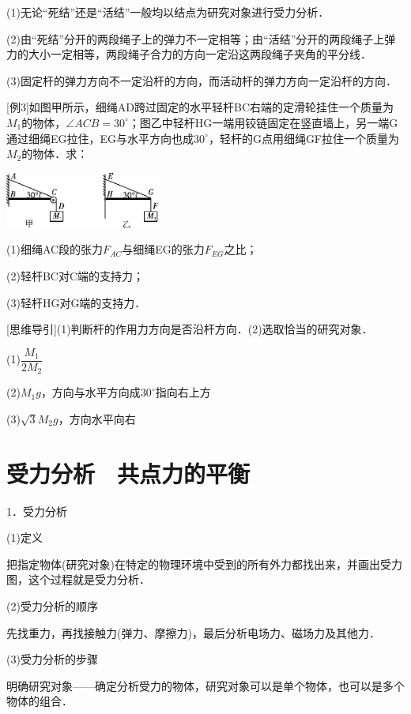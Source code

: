 \documentclass[cn,10.5pt,chinese,mac,chinesefont=founder]{elegantbook}
\begin{document}
(1)无论``死结''还是``活结''一般均以结点为研究对象进行受力分析．

(2)由``死结''分开的两段绳子上的弹力不一定相等；由``活结''分开的两段绳子上弹力的大小一定相等，两段绳子合力的方向一定沿这两段绳子夹角的平分线．

(3)固定杆的弹力方向不一定沿杆的方向，而活动杆的弹力方向一定沿杆的方向．

{[}例3{]}如图甲所示，细绳AD跨过固定的水平轻杆BC右端的定滑轮挂住一个质量为$M_1$的物体，$\angle ACB=30^\circ$；图乙中轻杆HG一端用铰链固定在竖直墙上，另一端G通过细绳EG拉住，EG与水平方向也成$30^\circ$，轻杆的G点用细绳GF拉住一个质量为$M_2$的物体．求：

\begin{center}\includegraphics[width=2.03125in,height=0.71875in]{media/image74.png}\end{center}

(1)细绳AC段的张力$F_{AC}$与细绳EG的张力$F_{EG}$之比；

(2)轻杆BC对C端的支持力；

(3)轻杆HG对G端的支持力．

{[}思维导引{]}(1)判断杆的作用力方向是否沿杆方向．(2)选取恰当的研究对象．
\begin{solution}

	(1)$\dfrac{M_1}{2M_2}$　
	
	(2)$M_1g$，方向与水平方向成$30^\circ$指向右上方
	
	(3)$\sqrt{3} M_2g$，方向水平向右
\end{solution}


\newpage
\section{受力分析　共点力的平衡}


1．受力分析

(1)定义

把指定物体(研究对象)在特定的物理环境中受到的所有外力都找出来，并画出受力图，这个过程就是受力分析．

(2)受力分析的顺序

先找重力，再找接触力(弹力、摩擦力)，最后分析电场力、磁场力及其他力．

(3)受力分析的步骤

明确研究对象------确定分析受力的物体，研究对象可以是单个物体，也可以是多个物体的组合．
\end{document}

